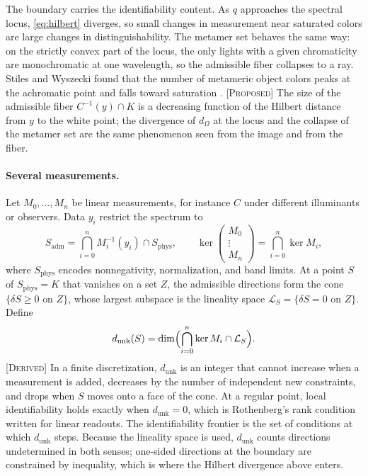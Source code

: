 \documentclass[11pt]{article}
\theoremstyle{boldplain}
\theoremstyle{boldupright}
\newcommand{\derived}{[\textup{\textsc{Derived}}]}
\newcommand{\proposed}{[\textup{\textsc{Proposed}}]}
\newcommand{\dunk}{d_{\mathrm{unk}}}
\newcommand{\Sphys}{S_{\mathrm{phys}}}
\newcommand{\Sadm}{S_{\mathrm{adm}}}
\begin{document}
The boundary carries the identifiability content. As $q$ approaches the spectral locus, \eqref{eq:hilbert} diverges,
so small changes in measurement near saturated colors are large changes in distinguishability. The
metamer set behaves the same way: on the strictly convex part of the locus, the only lights with
a given chromaticity are monochromatic at one wavelength, so the admissible fiber collapses to a
ray. Stiles and Wyszecki found that the number of metameric object colors peaks at the achromatic
point and falls toward saturation \cite{stiles1962}. \proposed{} The size of the admissible fiber $C^{-1}(y)\cap K$ is a
decreasing function of the Hilbert distance from $y$ to the white point; the divergence of $d_\Omega$ at the
locus and the collapse of the metamer set are the same phenomenon seen from the image and from
the fiber.

\paragraph{Several measurements.} Let $M_0,\dots,M_n$ be linear measurements, for instance $C$ under different
illuminants or observers. Data $y_i$ restrict the spectrum to
\begin{equation}\label{eq:adm}
\Sadm=\bigcap_{i=0}^nM_i^{-1}(y_i)\cap\Sphys,\qquad
\ker\begin{pmatrix}M_0\\ \vdots\\ M_n\end{pmatrix}=\bigcap_{i=0}^n\ker M_i,
\end{equation}
where $\Sphys$ encodes nonnegativity, normalization, and band limits. At a point $S$ of $\Sphys=K$ that
vanishes on a set $Z$, the admissible directions form the cone $\{\delta S\ge0\text{ on }Z\}$, whose largest subspace
is the lineality space $\mathcal{L}_S=\{\delta S=0\text{ on }Z\}$. Define
\begin{equation}\label{eq:dunk}
\dunk(S)=\dim\Bigl(\bigcap_{i=0}^n\ker M_i\cap\mathcal{L}_S\Bigr).
\end{equation}
\derived{} In a finite discretization, $\dunk$ is an integer that cannot increase when a measurement
is added, decreases by the number of independent new constraints, and drops when $S$ moves onto
a face of the cone. At a regular point, local identifiability holds exactly when $\dunk=0$, which
is Rothenberg's rank condition \cite{rothenberg1971} written for linear readouts. The identifiability frontier is the
set of conditions at which $\dunk$ steps. Because the lineality space is used, $\dunk$ counts directions
undetermined in both senses; one-sided directions at the boundary are constrained by inequality,
which is where the Hilbert divergence above enters.
\end{document}
